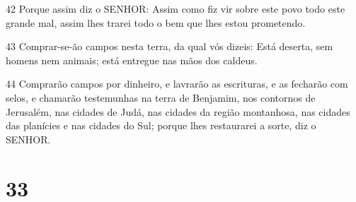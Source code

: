 \par 42 Porque assim diz o SENHOR: Assim como fiz vir sobre este povo todo este grande mal, assim lhes trarei todo o bem que lhes estou prometendo.
\par 43 Comprar-se-ão campos nesta terra, da qual vós dizeis: Está deserta, sem homens nem animais; está entregue nas mãos dos caldeus.
\par 44 Comprarão campos por dinheiro, e lavrarão as escrituras, e as fecharão com selos, e chamarão testemunhas na terra de Benjamim, nos contornos de Jerusalém, nas cidades de Judá, nas cidades da região montanhosa, nas cidades das planícies e nas cidades do Sul; porque lhes restaurarei a sorte, diz o SENHOR.

\chapter{33}

